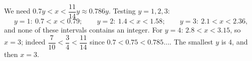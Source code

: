 We need $0.7y<x<\dfrac{11}{14}y\approx0.786y$. Testing $y=1,2,3$:
\[y=1:\ 0.7<x<0.79;\qquad y=2:\ 1.4<x<1.58;\qquad y=3:\ 2.1<x<2.36,\]
and none of these intervals contains an integer. For $y=4$: $2.8<x<3.15$, so $x=3$; indeed $\dfrac7{10}<\dfrac34<\dfrac{11}{14}$ since $0.7<0.75<0.785\ldots$. The smallest $y$ is $4$, and then $x=\boxed{3}$.
